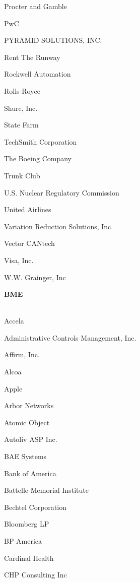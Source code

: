 \documentclass[twoside]{article}
\begin{document}
\begin{center}
\begin{multicols}{5}
\begin{FlushLeft}
\begin{compactitem}
\item Procter and Gamble
\item PwC
\item PYRAMID SOLUTIONS, INC.
\item Rent The Runway
\item Rockwell Automation
\item Rolls-Royce
\item Shure, Inc.
\item State Farm
\item TechSmith Corporation
\item The Boeing Company
\item Trunk Club
\item U.S. Nuclear Regulatory Commission
\item United Airlines
\item Variation Reduction Solutions, Inc.
\item Vector CANtech
\item Visa, Inc.
\item W.W. Grainger, Inc
\end{compactitem}
        \end{FlushLeft}
        \vspace{1em}
        {\fontsize{14}{16}\selectfont \bf BME}\\
        \vspace{-1em}
        ~\hrulefill~
        \vspace{-.9em}
        \begin{FlushLeft}
        \begin{compactitem}
        \item Accela
\item Administrative Controls Management, Inc.
\item Affirm, Inc.
\item Alcoa
\item Apple
\item Arbor Networks
\item Atomic Object
\item Autoliv ASP Inc.
\item BAE Systems
\item Bank of America
\item Battelle Memorial Institute
\item Bechtel Corporation
\item Bloomberg LP
\item BP America
\item Cardinal Health
\item CHP Consulting Inc

\end{compactitem}
\end{FlushLeft}
\end{multicols}
\end{center}
\end{document}
